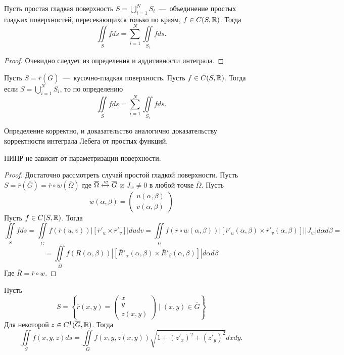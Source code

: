 \begin{lemma}
    Пусть простая гладкая поверхность $S = \bigcup\limits_{i = 1}^N S_i$~---~объединение простых гладких поверхностей, пересекающихся только по краям, $f \in C(S, \mathbb{R})$. Тогда \[\iint\limits_S fds = \sum\limits_{i = 1}^N \iint\limits_{S_i} fds.\]
\end{lemma}
\begin{proof}
    Очевидно следует из определения и аддитивности интеграла.
\end{proof}
\begin{definition}
    Пусть $S = \overline{r}(\overline{G})$~---~кусочно-гладкая поверхность. Пусть $f \in C(S, \mathbb{R})$. Тогда если $S = \bigcup\limits_{i = 1}^N S_i$, то по определению \[\iint\limits_S fds = \sum\limits_{i = 1}^N \iint\limits_{S_i} fds.\]
\end{definition}
\begin{fact}
    Определение корректно, и доказательство аналогично доказательству корректности интеграла Лебега от простых функций.
\end{fact}
\begin{theorem}
    ПИПР не зависит от параметризации поверхности.
\end{theorem}
\begin{proof}
    Достаточно рассмотреть случай простой гладкой поверхности. Пусть $S = \overline{r}(\overline{G}) = \overline{r} \circ w(\overline{\Omega})$ где $\overline{\Omega} \xleftrightarrow{w} \overline{G}$ и $J_w \neq 0$ в любой точке $\overline{\Omega}$. Пусть \begin{equation*}
        w(\alpha, \beta) = \begin{pmatrix}
            u(\alpha, \beta) \\ v(\alpha, \beta)
        \end{pmatrix}
    \end{equation*}
    Пусть $f \in C(S, \mathbb{R})$. Тогда \[\iint\limits_S fds = \iint\limits_{\overline{G}} f(\overline{r}(u, v))|[\overline{r}'_u \times \overline{r}'_v]|dudv = \iint\limits_{\overline{\Omega}} f(\overline{r}\circ w(\alpha, \beta))|[\overline{r}'_u(\alpha, \beta) \times \overline{r}'_v(\alpha, \beta)]||J_w|d\alpha d\beta = \]\[ = \iint\limits_{\overline{\Omega}} f(R(\alpha, \beta))|[\overline{R}'_\alpha(\alpha, \beta) \times \overline{R}'_\beta(\alpha, \beta)]|d\alpha d\beta\] 
    Где $\overline{R} = \overline{r} \circ w$.
\end{proof}
\begin{lemma}
    Пусть \[S = \left\{\overline{r}(x, y) = \begin{pmatrix}
        x \\ y \\ z(x, y)
    \end{pmatrix} \mid (x, y) \in \overline{G} \right\}\]
    Для некоторой $z \in C^1(\overline{G}, \mathbb{R})$. Тогда \[\iint\limits_S f(x, y, z)ds = \iint\limits_G f(x, y, z(x, y))\sqrt{1 + (z'_x)^2 + (z'_y)^2}dxdy.\]
\end{lemma}
